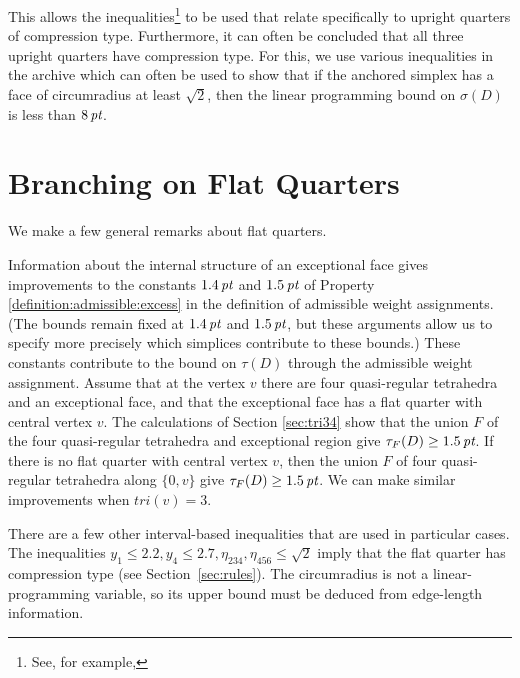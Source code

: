 This allows the inequalities\footnote{See, for example,
} to be used that relate specifically to upright
quarters of compression type.
Furthermore, it can often be concluded that all three upright
quarters have compression type. For this, we use various
inequalities in the archive
which can often be used to show that if the anchored simplex has a
face of circumradius at least $\sqrt2$, then the linear
programming bound on $\sigma(D)$ is less than $8\,\hbox{\it pt}$.



\section{Branching on Flat Quarters}

We make a few general remarks about flat quarters.



\begin{remark}
Information about the internal structure of an exceptional face
gives improvements to the constants $1.4\,\hbox{\it pt}$ and $1.5\,\hbox{\it pt}$ of
Property \ref{definition:admissible:excess} in the definition of
admissible weight assignments. (The bounds remain fixed at
$1.4\,\hbox{\it pt}$ and $1.5\,\hbox{\it pt}$, but these arguments allow us to specify
more precisely which simplices contribute to these bounds.) These
constants contribute to the bound on $\tau(D)$ through the
admissible weight assignment. Assume that at the vertex $v$ there
are four quasi-regular tetrahedra and an exceptional face, and
that the exceptional face has a flat quarter with central vertex
$v$. The calculations of Section \ref{sec:tri34} show that the
union $F$ of the four quasi-regular tetrahedra and exceptional
region give $\tau_F(D)\ge 1.5\,\hbox{\it pt}$. If there is no flat quarter
with central vertex $v$, then the union $F$ of four quasi-regular
tetrahedra along $\{0,v\}$ give $\tau_F(D)\ge 1.5\,\hbox{\it pt}$. We can make
similar improvements when $tri(v)=3$.
\end{remark}

\begin{remark} There are a few  other interval-based inequalities that are
used in particular cases. The inequalities
    $y_1\le 2.2, y_4\le2.7, \eta_{234},\eta_{456}\le\sqrt2$
imply that the flat quarter has compression type (see
Section~\ref{sec:rules}). The circumradius is not a
linear-programming variable, so its upper bound must be deduced
from edge-length information.
\end{remark}

